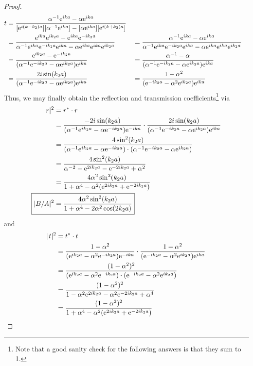 \documentclass[../psets.tex]{subfiles}
\begin{document}
\begin{enumerate}
\begin{proof}
\begin{align*}
                t &= \frac{\alpha^{-1}\e[ika]-\alpha\e[ika]}{[\e[i(k-k_2)a]][\alpha^{-1}\e[ika]]-[\alpha\e[ika]][\e[i(k+k_2)a]]}\\
            &= \frac{\e[ika]\e[ik_2a]-\e[ika]\e[-ik_2a]}{\alpha^{-1}\e[ika]\e[-ik_2a]\e[ika]-\alpha\e[ika]\e[ika]\e[ik_2a]}&
                &= \frac{\alpha^{-1}\e[ika]-\alpha\e[ika]}{\alpha^{-1}\e[ika]\e[-ik_2a]\e[ika]-\alpha\e[ika]\e[ika]\e[ik_2a]}\\
            &= \frac{\e[ik_2a]-\e[-ik_2a]}{(\alpha^{-1}\e[-ik_2a]-\alpha\e[ik_2a])\e[ika]}&
                &= \frac{\alpha^{-1}-\alpha}{(\alpha^{-1}\e[-ik_2a]-\alpha\e[ik_2a])\e[ika]}\\
            &= \frac{2i\sin(k_2a)}{(\alpha^{-1}\e[-ik_2a]-\alpha\e[ik_2a])\e[ika]}&
                &= \frac{1-\alpha^2}{(\e[-ik_2a]-\alpha^2\e[ik_2a])\e[ika]}
        \end{align*}
        Thus, we may finally obtain the reflection and transmission coefficients\footnote{Note that a good sanity check for the following answers is that they sum to 1.} via
        \begin{align*}
            |r|^2 &= r^*\cdot r\\
            &= \frac{-2i\sin(k_2a)}{(\alpha^{-1}\e[ik_2a]-\alpha\e[-ik_2a])\e[-ika]}\cdot\frac{2i\sin(k_2a)}{(\alpha^{-1}\e[-ik_2a]-\alpha\e[ik_2a])\e[ika]}\\
            &= \frac{4\sin^2(k_2a)}{(\alpha^{-1}\e[ik_2a]-\alpha\e[-ik_2a])\cdot(\alpha^{-1}\e[-ik_2a]-\alpha\e[ik_2a])}\\
            &= \frac{4\sin^2(k_2a)}{\alpha^{-2}-\e[2ik_2a]-\e[-2ik_2a]+\alpha^2}\\
            &= \frac{4\alpha^2\sin^2(k_2a)}{1+\alpha^4-\alpha^2(\e[2ik_2a]+\e[-2ik_2a])}\\
            \Aboxed{|B/A|^2 &= \frac{4\alpha^2\sin^2(k_2a)}{1+\alpha^4-2\alpha^2\cos(2k_2a)}}
        \end{align*}
        and
        \begin{align*}
            |t|^2 &= t^*\cdot t\\
            &= \frac{1-\alpha^2}{(\e[ik_2a]-\alpha^2\e[-ik_2a])\e[-ika]}\cdot\frac{1-\alpha^2}{(\e[-ik_2a]-\alpha^2\e[ik_2a])\e[ika]}\\
            &= \frac{(1-\alpha^2)^2}{(\e[ik_2a]-\alpha^2\e[-ik_2a])\cdot(\e[-ik_2a]-\alpha^2\e[ik_2a])}\\
            &= \frac{(1-\alpha^2)^2}{1-\alpha^2\e[2ik_2a]-\alpha^2\e[-2ik_2a]+\alpha^4}\\
            &= \frac{(1-\alpha^2)^2}{1+\alpha^4-\alpha^2(\e[2ik_2a]+\e[-2ik_2a])}\\

\end{align*}
\end{proof}
\end{enumerate}
\end{document}
